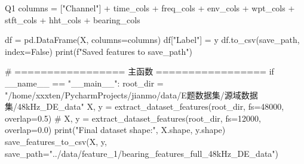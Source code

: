 \begin{Python}{Q1}
    columns = ["Channel"] + time_cols + freq_cols + env_cols + wpt_cols + stft_cols + hht_cols + bearing_cols

    df = pd.DataFrame(X, columns=columns)
    df["Label"] = y
    df.to_csv(save_path, index=False)
    print(f"Saved features to {save_path}")

# ================= 主函数 =================
if __name__ == "__main__":
    root_dir = "/home/xxxten/PycharmProjects/jianmo/data/E题数据集/源域数据集/48kHz_DE_data"
    X, y = extract_dataset_features(root_dir, fs=48000, overlap=0.5)
    # X, y = extract_dataset_features(root_dir, fs=12000, overlap=0.0)
    print("Final dataset shape:", X.shape, y.shape)
    save_features_to_csv(X, y, save_path="../data/feature_1/bearing_features_full_48kHz_DE_data")
\end{Python}
\vspace{2ex}

